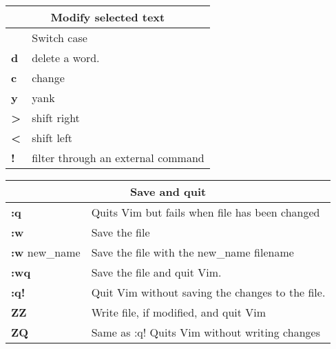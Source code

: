 \begin{table}[h]
\centering
\footnotesize
\begin{tabular}{|l|l|}
\multicolumn{2}{c}{\textbf{Modify selected text}}\\
\hline
\textbf{~}	& {Switch case}\\
\hline
\textbf{d}	& {delete a word.}\\
\hline
\textbf{c}	& {change}\\
\hline
\textbf{y}	& {yank}\\
\hline
\textbf{>}	& {shift right}\\
\hline
\textbf{<}	& {shift left}\\
\hline
\textbf{!}	& {filter through an external command}\\
\hline
\end{tabular}
\end{table}

\begin{table}[h]
\centering
\footnotesize
\begin{tabular}{|l|l|}
\multicolumn{2}{c}{\textbf{Save and quit}}\\
\hline
\textbf{:q}	& {Quits Vim but fails when file has been changed}\\
\hline
\textbf{:w}	& {Save the file}\\
\hline
{\textbf{:w} new\_name} & {Save the file with the new\_name filename}\\
\hline
\textbf{:wq} & {Save the file and quit Vim.}\\
\hline
\textbf{:q!} & {Quit Vim without saving the changes to the file.}\\
\hline
\textbf{ZZ}	& {Write file, if modified, and quit Vim}\\
\hline
\textbf{ZQ}	& {Same as :q! Quits Vim without writing changes}\\
\hline
\end{tabular}
\end{table}

\clearpage

